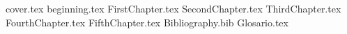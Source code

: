 \documentclass[11pt,oneside]{book}%
\begin{document}
	{cover.tex}%
	\frontmatter
	{beginning.tex}
	\tableofcontents
	\mainmatter
    {FirstChapter.tex}
    {SecondChapter.tex}
    {ThirdChapter.tex}
    {FourthChapter.tex}
    {FifthChapter.tex}
    {Bibliography.bib}
    {Glosario.tex}
        
%	
\end{document}
